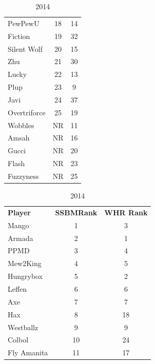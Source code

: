 \documentclass[10pt]{article}
\theoremstyle{definition}
\theoremstyle{remark}
\begin{document}
\begin{table}[!ht]
{\begin{tabular}{lcc}
    PewPewU         & 18                     & 14       \\
    Fiction         & 19                     & 32       \\
    Silent Wolf     & 20                     & 15       \\
    Zhu             & 21                     & 30       \\
    Lucky           & 22                     & 13       \\
    Plup            & 23                     & 9        \\
    Javi            & 24                     & 37       \\
    Overtriforce    & 25                     & 19       \\
    Wobbles         & NR                     & 11       \\
    Amsah           & NR                     & 16       \\
    Gucci           & NR                     & 20       \\
    Flash           & NR                     & 23       \\
    Fuzzyness       & NR                     & 25       \\
\end{tabular}
}
    \parbox{.35 \textwidth}{
        \centering
\caption{2014}
\begin{tabular}{lcc}
    \textbf{Player} & \textbf{SSBMRank} & \textbf{WHR Rank} \\
    Mango           & 1                      & 3        \\
    Armada          & 2                      & 1        \\
    PPMD            & 3                      & 4        \\
    Mew2King        & 4                      & 5        \\
    Hungrybox       & 5                      & 2        \\
    Leffen          & 6                      & 6        \\
    Axe             & 7                      & 7        \\
    Hax             & 8                      & 18       \\
    Westballz       & 9                      & 9        \\
    Colbol          & 10                     & 24       \\
    Fly Amanita     & 11                     & 17       \\

\end{tabular}}
\end{table}
\end{document}
